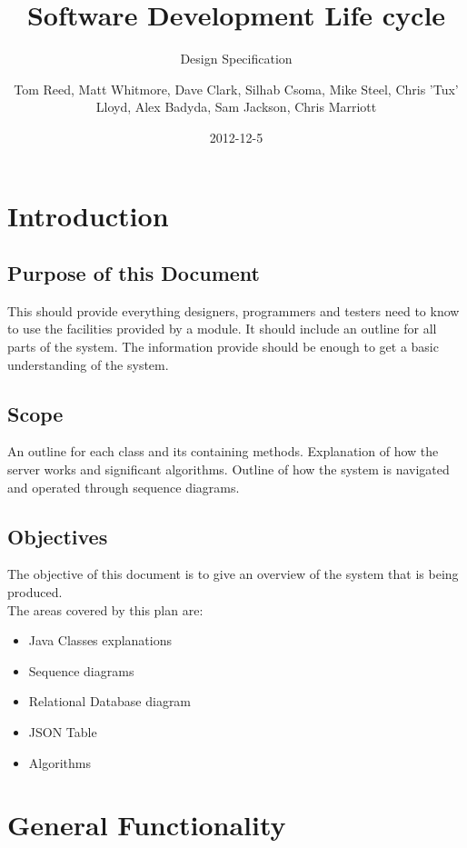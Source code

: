 \documentclass{project}
\begin{document}
\title{Software Development Life cycle}
\subtitle{Design Specification}
\author{Tom Reed, Matt Whitmore, Dave Clark, Silhab Csoma, Mike Steel, Chris 'Tux' Lloyd, Alex Badyda, Sam Jackson, Chris Marriott}
\date{2012-12-5}
\maketitle
\tableofcontents
\newpage
\section{Introduction}
\subsection{Purpose of this Document}
This should provide everything designers, programmers and testers need to know to use the facilities
provided by a module. It should include an outline for all parts of the system. The information provide should be enough to get a basic understanding of the system.

\subsection{Scope}
An outline for each class and its containing methods. Explanation of how the server works and significant algorithms. Outline of how the system is navigated and operated through sequence diagrams.

\subsection{Objectives}
The objective of this document is to give an overview of the system that is being produced.
\\
The areas covered by this plan are:
\begin{itemize}
	\item Java Classes explanations
	\item Sequence diagrams
	\item Relational Database diagram
	\item JSON Table
	\item Algorithms
\end{itemize}

\section{General Functionality}
\end{document}
